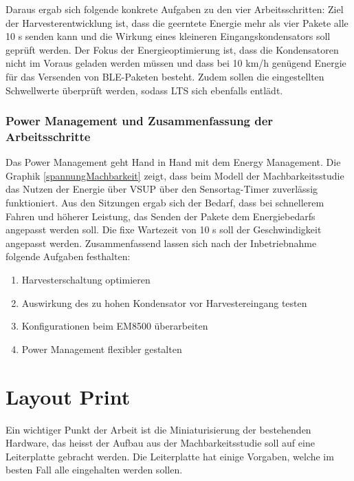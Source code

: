 Daraus ergab sich folgende konkrete Aufgaben zu den vier Arbeitsschritten: Ziel der Harvesterentwicklung ist, dass die geerntete Energie mehr als vier Pakete alle 10 s senden kann und die Wirkung eines kleineren Eingangskondensators soll geprüft werden. Der Fokus der Energieoptimierung ist, dass die Kondensatoren nicht im Voraus geladen werden müssen und dass bei 10 km/h genügend Energie für das Versenden von BLE-Paketen besteht. Zudem sollen die eingestellten Schwellwerte überprüft werden, sodass LTS sich ebenfalls entlädt.


\subsubsection{Power Management und Zusammenfassung der Arbeitsschritte}

Das Power Management geht Hand in Hand mit dem Energy Management. Die Graphik \ref{spannungMachbarkeit} zeigt, dass beim Modell der Machbarkeitsstudie das Nutzen der Energie über VSUP über den Sensortag-Timer zuverlässig funktioniert. Aus den Sitzungen ergab sich der Bedarf, dass bei schnellerem Fahren und höherer Leistung, das Senden der Pakete dem Energiebedarfs angepasst werden soll. Die fixe Wartezeit von 10 s soll der Geschwindigkeit angepasst werden. Zusammenfassend lassen sich nach der Inbetriebnahme folgende Aufgaben festhalten:

\begin{enumerate}
    \item Harvesterschaltung optimieren
    \item Auswirkung des zu hohen Kondensator vor Harvestereingang testen
    \item Konfigurationen beim EM8500 überarbeiten
    \item Power Management flexibler gestalten
\end{enumerate}


\section{Layout Print}

Ein wichtiger Punkt der Arbeit ist die Miniaturisierung der bestehenden Hardware, das heisst der Aufbau aus der Machbarkeitsstudie soll auf eine Leiterplatte gebracht werden. Die Leiterplatte hat einige Vorgaben, welche im besten Fall alle eingehalten werden sollen.

